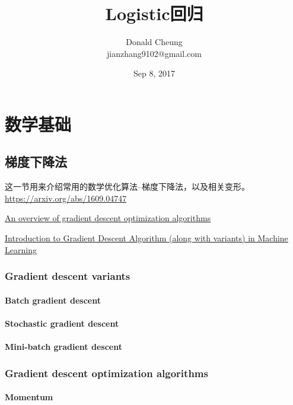 \documentclass[10pt,a4paper]{ctexbook}
\begin{document}
    \setlength{\baselineskip}{20pt}
    \title{Logistic回归}
    \author{Donald Cheung\\jianzhang9102@gmail.com}
    \date{Sep 8, 2017}
    \maketitle
    \tableofcontents
\fi

\chapter{数学基础}
\section{梯度下降法}
这一节用来介绍常用的数学优化算法--梯度下降法，以及相关变形。
\href{An overview of gradient descent optimization algorithms}{https://arxiv.org/abs/1609.04747}

\href{http://ruder.io/optimizing-gradient-descent}{An overview of gradient descent optimization algorithms}

\href{https://www.analyticsvidhya.com/blog/2017/03/introduction-to-gradient-descent-algorithm-along-its-variants/}{Introduction to Gradient Descent Algorithm (along with variants) in Machine Learning
}

\subsection{Gradient descent variants}
\subsubsection{Batch gradient descent}
\subsubsection{Stochastic gradient descent}
\subsubsection{Mini-batch gradient descent}

\subsection{Gradient descent optimization algorithms}
\subsubsection{Momentum}
\end{document}
